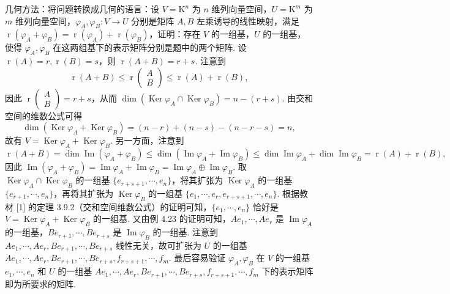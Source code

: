 \documentclass[UTF8,12pt,a4paper,fontset=fandol]{ctexart}
\begin{document}
几何方法：将问题转换成几何的语言：设 $V=\mathrm{K}^n$ 为 $n$ 维列向量空间，$U=\mathrm{K}^m$ 为 $m$ 维列向量空间，$\varphi_A,\varphi_B:V\to U$ 分别是矩阵 $A,B$ 左乘诱导的线性映射，满足 $\operatorname{r}(\varphi_A+\varphi_B)=\operatorname{r}(\varphi_A)+\operatorname{r}(\varphi_B)$，证明：存在 $V$ 的一组基，$U$ 的一组基，使得 $\varphi_A,\varphi_B$ 在这两组基下的表示矩阵分别是题中的两个矩阵. 设 $\operatorname{r}(A)=r,\operatorname{r}(B)=s$，则 $\operatorname{r}(A+B)=r+s$. 注意到
\[
\operatorname{r}(A+B)\le \operatorname{r}\left(\begin{array}{c}A\\B\end{array}\right)\le\operatorname{r}(A)+\operatorname{r}(B),
\]
因此 $\operatorname{r}\left(\begin{array}{c}A\\B\end{array}\right)=r+s$，从而 $\dim(\operatorname{Ker}\varphi_A\cap\operatorname{Ker}\varphi_B)=n-(r+s)$. 由交和空间的维数公式可得
\[
\dim(\operatorname{Ker}\varphi_A+\operatorname{Ker}\varphi_B)=(n-r)+(n-s)-(n-r-s)=n,
\]
故有 $V=\operatorname{Ker}\varphi_A+\operatorname{Ker}\varphi_B$. 另一方面，注意到
\[
\operatorname{r}(A+B)=\dim\operatorname{Im}(\varphi_A+\varphi_B)\le\dim(\operatorname{Im}\varphi_A+\operatorname{Im}\varphi_B)\le\dim\operatorname{Im}\varphi_A+\dim\operatorname{Im}\varphi_B=\operatorname{r}(A)+\operatorname{r}(B),
\]
因此 $\operatorname{Im}(\varphi_A+\varphi_B)=\operatorname{Im}\varphi_A+\operatorname{Im}\varphi_B=\operatorname{Im}\varphi_A\oplus\operatorname{Im}\varphi_B$. 取 $\operatorname{Ker}\varphi_A\cap\operatorname{Ker}\varphi_B$ 的一组基 $\{e_{r+s+1},\cdots,e_n\}$，将其扩张为 $\operatorname{Ker}\varphi_A$ 的一组基 $\{e_{r+1},\cdots,e_n\}$，再将其扩张为 $\operatorname{Ker}\varphi_B$ 的一组基 $\{e_1,\cdots,e_r,e_{r+s+1},\cdots,e_n\}$. 根据教材 [1] 的定理 3.9.2（交和空间维数公式）的证明可知，$\{e_1,\cdots,e_n\}$ 恰好是 $V=\operatorname{Ker}\varphi_A+\operatorname{Ker}\varphi_B$ 的一组基. 又由例 4.23 的证明可知，$Ae_1,\cdots,Ae_r$ 是 $\operatorname{Im}\varphi_A$ 的一组基，$Be_{r+1},\cdots,Be_{r+s}$ 是 $\operatorname{Im}\varphi_B$ 的一组基. 注意到 $Ae_1,\cdots,Ae_r,Be_{r+1},\cdots,Be_{r+s}$ 线性无关，故可扩张为 $U$ 的一组基 $Ae_1,\cdots,Ae_r,Be_{r+1},\cdots,Be_{r+s},f_{r+s+1},\cdots,f_m$. 最后容易验证 $\varphi_A,\varphi_B$ 在 $V$ 的一组基 $e_1,\cdots,e_n$ 和 $U$ 的一组基 $Ae_1,\cdots,Ae_r,Be_{r+1},\cdots,Be_{r+s},f_{r+s+1},\cdots,f_m$ 下的表示矩阵即为所要求的矩阵.
\end{document}
